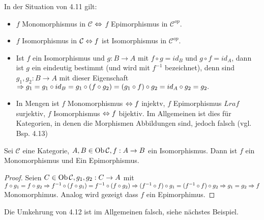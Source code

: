 \begin{anm}
	In der Situation von 4.11 gilt:
	\begin{itemize}
		\item $f$ Monomorphismus in $\mathcal{C}$ $\Leftrightarrow$ $f$ Epimorphismus in $\mathcal{C}^{op}.$
		\item $f$ Isomorphismus in $\mathcal{C} \Leftrightarrow  f $ ist Isomorphismus in $\mathcal{C}^{op}.$
		\item Ist $f$ ein Isomorphismus und $g:B \to A $ mit $ f \circ g = id_B $ und $g \circ f = id_A$, dann ist $g$ ein eindeutig bestimmt (und wird mit $f^{-1} $ bezeichnet), denn sind $g_1,g_2: B \to A$ mit dieser Eigenschaft $\Rightarrow g_1 = g_1 \circ id_B = g_1 \circ (f \circ g_2) =(g_1 \circ f) \circ g_2 = id_A \circ g_2 = g_2.$
		\item In Mengen ist $f$ Monomorphismus $\Leftrightarrow f $ injektv, $f$ Epimorphismus $Lra f$ surjektiv, $f$ Isomorphismus $\Leftrightarrow f $ bijektiv. Im Allgemeinen ist dies für Kategorien, in denen die Morphismen Abbildungen sind, jedoch falsch (vgl. Bsp. 4.13)
	\end{itemize}
\end{anm}
\begin{bem}
	Sei $\mathcal{C}$ eine Kategorie, $A,B \in \text{Ob}\,\mathcal{C}, f:A \to B $ ein Isomorphismus. Dann ist $f$ ein Monomorphismus und Ein Epimorphismus.
	\begin{proof}
		Seien $ C \in \text{Ob}\,\mathcal{C} , g_1,g_2:C \to A $ mit $ f \circ g_1 = f \circ g_2 \Rightarrow f^{-1} \circ (f \circ g_1) = f^{-1} \circ (f \circ g_2) \Rightarrow (f^{-1} \circ f) \circ g_1 = (f^{-1} \circ f) \circ g_2 \Rightarrow g_1=g_2 \Rightarrow f $ Monomorphimus. Analog wird gezeigt dass $f$ ein Epimorphimus.
	\end{proof}
\end{bem}
\begin{anm}
	Die Umkehrung von 4.12 ist im Allgemeinen falsch, siehe nächstes Beispiel.
\end{anm}
